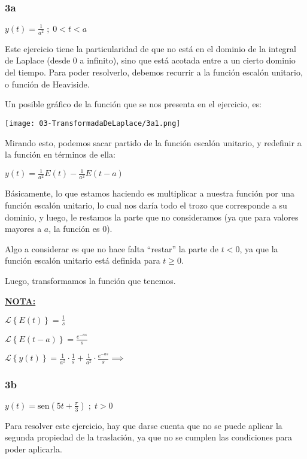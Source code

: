 \documentclass[11pt]{article}
\def\sen{\mathrm{sen}}
\newcommand{\lapl}[1]{\mathscr{L} \left\lbrace {#1} \right\rbrace}
\begin{document}
    \subsubsection{3a}
    $\displaystyle y(t)=\frac{1}{a^{2}} \;;\;0<t<a$
    
    Este ejercicio tiene la particularidad de que no está en el dominio de la integral de Laplace (desde 0 a infinito), sino que está acotada entre a un cierto dominio del tiempo. Para poder resolverlo, debemos recurrir a la función escalón unitario, o función de Heaviside.
    
    Un posible gráfico de la función que se nos presenta en el ejercicio, es:
    
    \texttt{[image: 03-TransformadaDeLaplace/3a1.png]}
    
    Mirando esto, podemos sacar partido de la función escalón unitario, y redefinir a la función en términos de ella:
    
    $\displaystyle y(t)=\frac{1}{a^{2}}E(t)-\frac{1}{a^{2}}E(t-a)$
    
    Básicamente, lo que estamos haciendo es multiplicar a nuestra función por una función escalón unitario, lo cual nos daría todo el trozo que corresponde a su dominio, y luego, le restamos la parte que no consideramos (ya que para valores mayores a $a$, la función es 0).
    
    Algo a considerar es que no hace falta ``restar'' la parte de $t<0$, ya que la función escalón unitario está definida para $t \geq 0$.
    
    Luego, transformamos la función que tenemos. 
    
    \textbf{\underline{NOTA:}} 
    
    $\displaystyle \lapl{E(t)}=\frac{1}{s}$
    
    $\displaystyle \lapl{E(t-a)}=\frac{e^{-as}}{s}$
    
    $\displaystyle \lapl{y(t)}=\frac{1}{a^{2}} \cdot \frac{1}{s}+ \frac{1}{a^{2}} \cdot \frac{e^{-as}}{s} \implies$
    
    \subsubsection{3b}
    $y(t)=\sen \left(5t+\frac{\pi}{3} \right)\;;\;t>0$
    
    Para resolver este ejercicio, hay que darse cuenta que no se puede aplicar la segunda propiedad de la traslación, ya que no se cumplen las condiciones para poder aplicarla.
    
\end{document}
